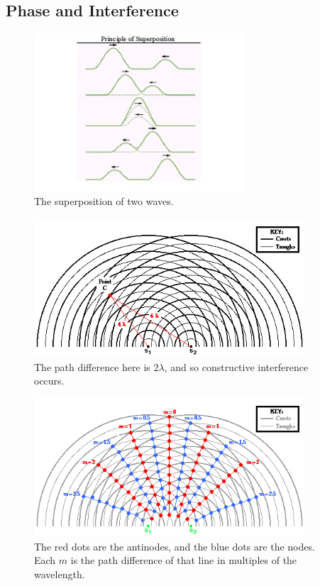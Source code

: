 \documentclass[a4paper]{amsbook}
\newcommand\capcite[1]{}
\begin{document}
\subsection{Phase and Interference}
\begin{figure}
  \centering
  \includegraphics[width=0.7\textwidth]{superposition}
  \caption{The superposition of two waves. \capcite{http://www.cyberphysics.co.uk/topics/waves/img003.jpg}\label{fig:superposition}}
\end{figure}
\begin{figure}
  \centering
  \includegraphics[width=0.9\textwidth]{pathdifference}
  \caption{The path difference here is $ 2\lambda $, and so constructive interference occurs. \capcite{http://www.physicsclassroom.com/Class/light/u12l3b3.gif}\label{fig:pathdifference}}
\end{figure}
\begin{figure}
  \centering
  \includegraphics[width=0.9\textwidth]{pathdifference2}
  \caption{The red dots are the antinodes, and the blue dots are the nodes. Each $ m $ is the path difference of that line in multiples of the wavelength. \capcite{http://www.physicsclassroom.com/Class/light/u12l3b1.gif}\label{fig:pathdifference2}}
\end{figure}
\end{document}

